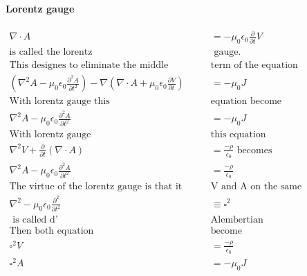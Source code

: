\paragraph{Lorentz gauge}
\begin{align*}
\nabla \cdot A &=-\mu_{0} \epsilon_{0} \frac{\partial}{\partial t}V\\
\text{is called the lorentz}&\text{ gauge.}\\
\text{This designes to eliminate the middle }&\text{term of the equation}\\
\left( \nabla^2A-\mu_{0}\epsilon_{0}\frac{\partial^2 A}{\partial t^2}\right) -\nabla\left( \nabla \cdot A+\mu_{0}\epsilon_{0}\frac{\partial V}{\partial t}\right) &=-\mu_{0} J\\
\text{With lorentz gauge this }&\text{equation become}\\
\nabla^2A-\mu_{0}\epsilon_{0}\frac{\partial^2 A}{\partial t^2}&=-\mu_{0} J\\
\text{With lorentz gauge  }&\text{this equation}\\
\nabla ^2V+\frac{\partial }{\partial t}(\nabla \cdot A)&=\frac{-\rho}{\epsilon_{0}}
\text{ becomes }\\
\nabla^2A-\mu_{0}\epsilon_{0}\frac{\partial^2 A}{\partial t^2}&=\frac{-\rho}{\epsilon_{0}}\\
\text{The virtue of the lorentz gauge is that it treats }&\text{V and A on the same differential operator}\\
\nabla^2-\mu_{0} \epsilon_{0}\frac{\partial ^2}{\partial t^2}&\equiv \square^2  \\
\text{ is called d'}&\text{Alembertian}\\
\text{Then both equation }&\text{become}\\
\square^2V&=\frac{-\rho}{\epsilon_{0}}\\
\square^2A&=-\mu_{0} J
\end{align*}
